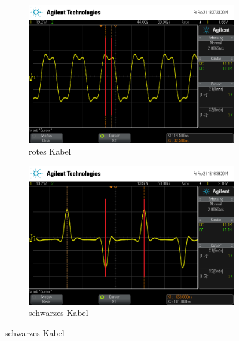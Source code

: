 %
\begin{figure}
  \centering

  \begin{subfigure}{0.4\textwidth}
    \includegraphics[width=\textwidth]{laenge_rot.png}
    \caption{rotes Kabel}
    \label{fig:laenge_rot}
  \end{subfigure}
  \quad
  \begin{subfigure}{0.4\textwidth}
    \includegraphics[width=\textwidth]{laenge_schwarz.png}
    \caption{schwarzes Kabel}
    \label{fig:laenge_schwarz}
  \end{subfigure}


\end{figure}
